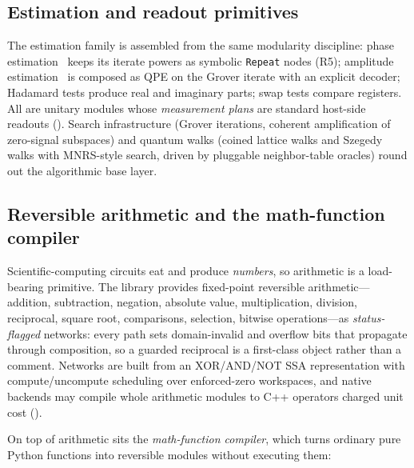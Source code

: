 \subsection{Estimation and readout primitives}
\label{sec:estimation}

The estimation family is assembled from the same modularity discipline:
phase estimation~\cite{kitaev1995pea,nielsen2000quantum} keeps its iterate powers as symbolic \texttt{Repeat} nodes
(R5); amplitude estimation~\cite{brassard2002amplitude} is composed as QPE on the Grover iterate with an
explicit decoder; Hadamard tests produce real and imaginary parts; swap
tests compare registers.  All are unitary modules whose \emph{measurement
plans} are standard host-side readouts ().  Search
infrastructure (Grover iterations, coherent amplification of zero-signal
subspaces) and quantum walks (coined lattice walks and Szegedy walks with
MNRS-style search, driven by pluggable neighbor-table oracles) round out the
algorithmic base layer.

\subsection{Reversible arithmetic and the math-function compiler}
\label{sec:mathfunc}

Scientific-computing circuits eat and produce \emph{numbers}, so arithmetic
is a load-bearing primitive.  The library provides fixed-point reversible
arithmetic---addition, subtraction, negation, absolute value,
multiplication, division, reciprocal, square root, comparisons, selection,
bitwise operations---as \emph{status-flagged} networks: every path sets
domain-invalid and overflow bits that propagate through composition, so a
guarded reciprocal is a first-class object rather than a comment.  Networks
are built from an XOR/AND/NOT SSA representation with compute/uncompute
scheduling over enforced-zero workspaces, and native backends may compile
whole arithmetic modules to C++ operators charged unit cost
().

On top of arithmetic sits the \emph{math-function compiler}, which turns
ordinary pure Python functions into reversible modules without executing
them:

